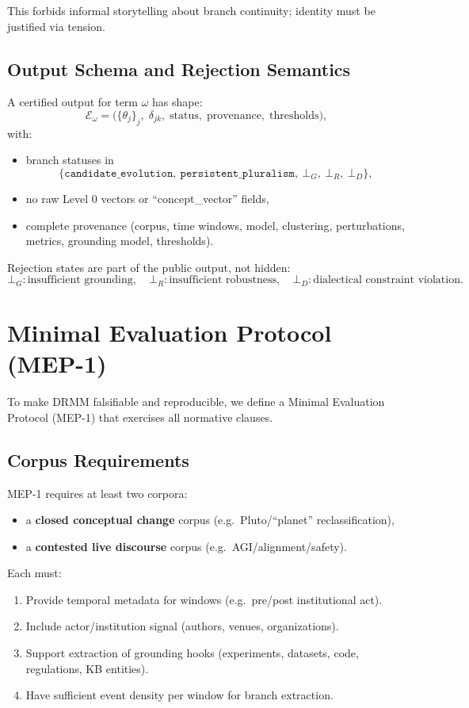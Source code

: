 \documentclass[11pt, a4paper]{article}
\begin{document}
This forbids informal storytelling about branch continuity; identity must be justified via tension.

\subsection{Output Schema and Rejection Semantics}

A certified output for term $\omega$ has shape:
\[
\mathcal{E}_\omega =
\bigl(
  \{\theta_j\}_j,\;
  \delta_{jk},\;
  \mathrm{status},\;
  \mathrm{provenance},\;
  \mathrm{thresholds}
\bigr),
\]
with:
\begin{itemize}[nosep]
  \item branch statuses in
  \[
  \{\texttt{candidate\_evolution},\ \texttt{persistent\_pluralism},\ \bot_G,\ \bot_R,\ \bot_D\},
  \]
  \item no raw Level 0 vectors or ``concept\_vector'' fields,
  \item complete provenance (corpus, time windows, model, clustering, perturbations, metrics, grounding model, thresholds).
\end{itemize}

Rejection states are part of the public output, not hidden:
\[
\bot_G: \text{insufficient grounding}, \quad
\bot_R: \text{insufficient robustness}, \quad
\bot_D: \text{dialectical constraint violation}.
\]
\newpage
\section{Minimal Evaluation Protocol (MEP-1)}

To make DRMM falsifiable and reproducible, we define a Minimal Evaluation Protocol (MEP-1) that exercises all normative clauses.

\subsection{Corpus Requirements}

MEP-1 requires at least two corpora:
\begin{itemize}[nosep]
  \item a \textbf{closed conceptual change} corpus (e.g.\ Pluto/``planet'' reclassification),
  \item a \textbf{contested live discourse} corpus (e.g.\ AGI/alignment/safety).
\end{itemize}

Each must:
\begin{enumerate}[nosep]
  \item Provide temporal metadata for windows (e.g.\ pre/post institutional act).
  \item Include actor/institution signal (authors, venues, organizations).
  \item Support extraction of grounding hooks (experiments, datasets, code, regulations, KB entities).
  \item Have sufficient event density per window for branch extraction.
\end{enumerate}
\end{document}
